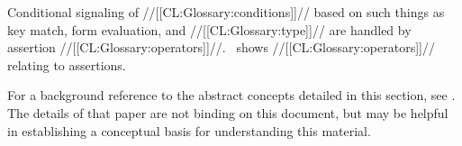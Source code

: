 \endsubsubsection%
\endSubsection%
\goodbreak
{}
 
Conditional signaling of //[[CL:Glossary:conditions]]//
based on such things as key match, form evaluation,
and //[[CL:Glossary:type]]// are handled by assertion //[[CL:Glossary:operators]]//.
\Thenextfigure\ shows //[[CL:Glossary:operators]]// relating to assertions.

 
\endSubsection%




























For a background reference to the abstract concepts detailed in this
section, see \CondSysPaper.  The details of that paper are not binding on
this document, but may be helpful in establishing a conceptual basis for
understanding this material.

\endsubsection%
